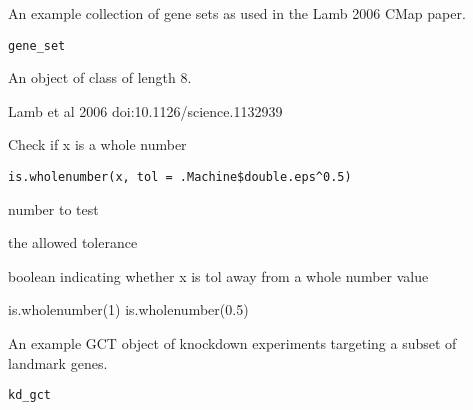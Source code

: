 \documentclass[letterpaper]{book}
\begin{document}
%
\begin{Description}\relax
An example collection of gene sets
as used in the Lamb 2006 CMap paper.
\end{Description}
%
\begin{Usage}
\begin{verbatim}
gene_set
\end{verbatim}
\end{Usage}
%
\begin{Format}
An object of class  of length 8.
\end{Format}
%
\begin{Source}\relax
Lamb et al 2006 doi:10.1126/science.1132939
\end{Source}
%
\begin{Description}\relax
Check if x is a whole number
\end{Description}
%
\begin{Usage}
\begin{verbatim}
is.wholenumber(x, tol = .Machine$double.eps^0.5)
\end{verbatim}
\end{Usage}
%
\begin{Arguments}
\begin{ldescription}
\item[\code{x}] number to test

\item[\code{tol}] the allowed tolerance
\end{ldescription}
\end{Arguments}
%
\begin{Value}
boolean indicating whether x is tol away from a whole number value
\end{Value}
%
\begin{Examples}
\begin{ExampleCode}
is.wholenumber(1)
is.wholenumber(0.5)
\end{ExampleCode}
\end{Examples}
%
\begin{Description}\relax
An example GCT object of knockdown experiments
targeting a subset of landmark genes.
\end{Description}
%
\begin{Usage}
\begin{verbatim}
kd_gct
\end{verbatim}
\end{Usage}
\end{document}
